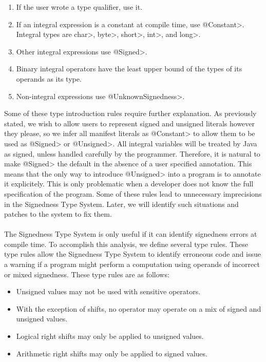 \begin{enumerate}
  \item If the user wrote a type qualifier, use it.
  \item If an integral expression is a constant at compile time, use
    \<@Constant>.
    Integral types are \<char>, \<byte>, \<short>, \<int>, and \<long>.
  \item Other integral expressions use \<@Signed>.
  \item Binary integral operators have the least upper bound of the types of
  its operands as its type.
  \item Non-integral expressions use \<@UnknownSignedness>.
\end{enumerate}

Some of these type introduction rules require further explanation. As
previously stated, we wish to allow users to represent signed and unsigned
literals however they please, so we infer all manifest literals as
\<@Constant> to allow them to be used as \<@Signed> or \<@Unsigned>. All
integral variables will be treated by Java as signed, unless handled
carefully by the programmer. Therefore, it is natural to make \<@Signed> the
default in the absence of a user specified annotation. This means that
the only way to introduce \<@Unsigned> into a program is to annotate it
explicitely. This is only problematic when a developer does not know the
full specification of the program. Some of these rules lead to unnecessary
imprecisions in the Signedness Type System. Later, we will identify such
situations and patches to the system to fix them.\\
\\
The Signedness Type System is only useful if it can identify signedness errors
at compile time. To accomplish this analysis, we define several
type rules. These type rules allow the Signedness Type System to identify
erroneous code and issue a warning if a program
might perform a computation using operands of incorrect or mixed signedness.
These type rules are as follows:

\begin{itemize}
  \item Unsigned values may not be used with sensitive
    operators.
  \item With the exception of shifts, no operator may operate on a mix of
    signed and unsigned values.
  \item Logical right shifts may only be applied to unsigned values.
  \item Arithmetic right shifts may only be applied to signed values.
\end{itemize}

